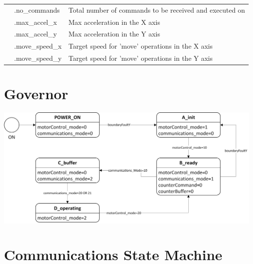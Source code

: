 \begin{center}
\begin{tabular}{|l|l|p{10cm}|}
					 & .no\_commands & Total number of commands to be received and executed on\\ \cline{2-3}
					 & .max\_accel\_x & Max acceleration in the X axis\\ \cline{2-3}
					 &  .max\_accel\_y & Max acceleration in the Y axis\\ \cline{2-3}
					 & .move\_speed\_x & Target speed for 'move' operations in the X axis\\ \cline{2-3}
					 & .move\_speed\_y & Target speed for 'move' operations in the Y axis\\ \hline
			\end{tabular}
			\label{table:globalvariables}
		\end{center}


\section{Governor}

		\begin{center}
				\includegraphics[width=\textwidth]{figures/cncMachine/governor}
				\label{fig:PLC-flowcharts-governor}
		\end{center}

\section{Communications State Machine}
\label{sec:PLC-flowcharts-comms}

